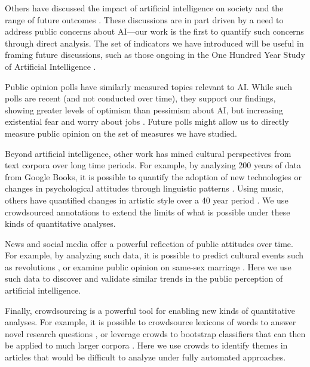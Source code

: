 \documentclass[letterpaper]{article}
\begin{document}
Others have discussed the impact of artificial intelligence on society and the range of future outcomes \cite{ai-concerns}. These discussions are in part driven by a need to address public concerns about AI---our work is the first to quantify such concerns through direct analysis. The set of indicators we have introduced will be useful in framing future discussions, such as those ongoing in the One Hundred Year Study of Artificial Intelligence \cite{100years}.  

Public opinion polls have similarly measured topics relevant to AI. While such polls are recent (and not conducted over time), they support our findings, showing greater levels of optimism than pessimism about AI, but increasing existential fear and worry about jobs \cite{bsa-poll,cbs-poll}. Future polls might allow us to directly measure public opinion on the set of measures we have studied. 

Beyond artificial intelligence, other work has mined cultural perspectives from text corpora over long time periods. For example, by analyzing 200 years of data from Google Books, it is possible to quantify the adoption of new technologies or changes in psychological attitudes through linguistic patterns \cite{google-culture,psych-culture}. Using music, others have quantified changes in artistic style over a 40 year period \cite{music-over-time}. We use crowdsourced annotations to extend the limits of what is possible under these kinds of quantitative analyses.


News and social media offer a powerful reflection of public attitudes over time. For example, by analyzing such data, it is possible to predict cultural events such as revolutions \cite{future1,future2}, or examine public opinion on same-sex marriage \cite{marriage}. Here we use such data to discover and validate similar trends in the public perception of artificial intelligence. 

Finally, crowdsourcing is a powerful tool for enabling new kinds of quantitative analyses. For example, it is possible to crowdsource lexicons of words to answer novel research questions \cite{empath}, or leverage crowds to bootstrap classifiers that can then be applied to much larger corpora \cite{politeness,dogmatism}. Here we use crowds to identify themes in articles that would be difficult to analyze under fully automated approaches.
\end{document}
